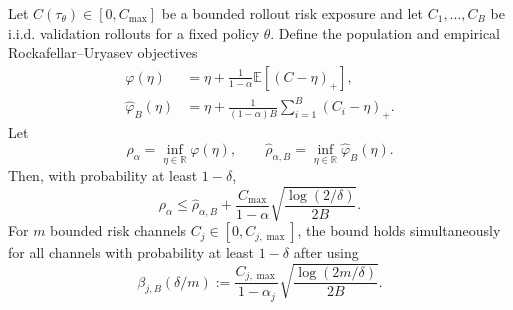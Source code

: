 \begin{lemma}
\label{lem:cvar_ucb}
Let $C(\tau_\theta)\in[0,C_{\max}]$ be a bounded rollout risk exposure and let
$C_1,\dots,C_B$ be i.i.d. validation rollouts for a fixed policy $\theta$. Define the
population and empirical Rockafellar--Uryasev objectives
\begin{align}
    \varphi(\eta)
    &=
    \eta+\frac{1}{1-\alpha}\mathbb E[(C-\eta)_+], \\
    \widehat\varphi_B(\eta)
    &=
    \eta+\frac{1}{(1-\alpha)B}\sum_{i=1}^B(C_i-\eta)_+ .
\end{align}
Let
\[
    \rho_\alpha=\inf_{\eta\in\mathbb R}\varphi(\eta),
    \qquad
    \widehat\rho_{\alpha,B}=\inf_{\eta\in\mathbb R}\widehat\varphi_B(\eta).
\]
Then, with probability at least $1-\delta$,
\begin{equation}
    \rho_\alpha
    \le
    \widehat\rho_{\alpha,B}
    +
    \frac{C_{\max}}{1-\alpha}
    \sqrt{\frac{\log(2/\delta)}{2B}} .
    \label{eq:app:cvar_ucb_single}
\end{equation}
For $m$ bounded risk channels $C_j\in[0,C_{j,\max}]$, the bound holds
simultaneously for all channels with probability at least $1-\delta$ after using
\begin{equation}
    \beta_{j,B}(\delta/m)
    :=
    \frac{C_{j,\max}}{1-\alpha_j}
    \sqrt{\frac{\log(2m/\delta)}{2B}} .
    \label{eq:app:explicit_cvar_beta}
\end{equation}
\end{lemma}

